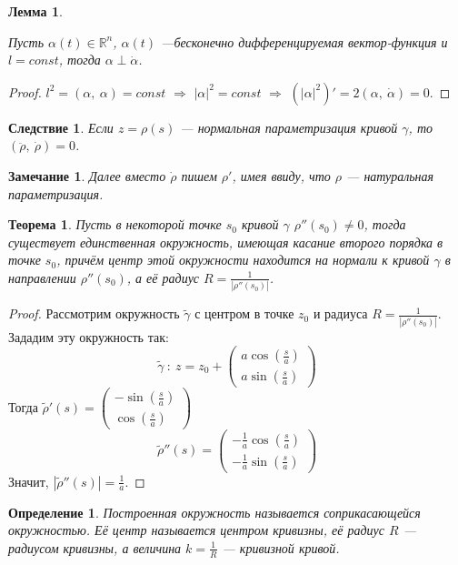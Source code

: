 \documentclass[12pt]{article}
\theoremstyle{plain}
\newtheorem{theorem}{Теорема}[section]
\newtheorem{consequence}{Следствие}[theorem]
\newtheorem{lemma}{Лемма}[section]
\newtheorem{definition}{Определение}[section]
\newtheorem{remark}{Замечание}
\newcommand{\R}{\mathbb R}
\begin{document}
    \begin{lemma}
        \hypertarget{d1}{}
        Пусть $\alpha(t)\in\R^n$, $\alpha(t)$ ---бесконечно дифференцируемая вектор-функция и $l=const$, тогда $\alpha\perp\dot{\alpha}$.
    \end{lemma}
    \begin{proof}
        $l^2=(\alpha, \ \alpha)=const$ $\Longrightarrow$ $|\alpha|^2=const$ $\Longrightarrow$ $(|\alpha|^2)'=2(\alpha, \ \dot{\alpha})=0$.
    \end{proof}
    \begin{consequence}
        Если $z=\rho(s)$ --- нормальная параметризация кривой $\gamma$, то $(\ddot{\rho}, \ \dot{\rho})=0$.
    \end{consequence}
    \begin{remark}
        Далее вместо $\dot{\rho}$ пишем $\rho'$, имея ввиду, что $\rho$ --- натуральная параметризация.
    \end{remark}
    \begin{theorem}
        Пусть в некоторой точке $s_0$ кривой $\gamma$ $\rho''(s_0)\neq0$, тогда существует единственная окружность, имеющая касание второго порядка в точке $s_0$, причём центр этой окружности находится на нормали к кривой $\gamma$ в направлении $\rho''(s_0)$, а её радиус $R=\frac{1}{|\rho''(s_0)|}$.
    \end{theorem}
    \begin{proof}
        Рассмотрим окружность $\tilde{\gamma}$ с центром в точке $z_0$ и радиуса $R=\frac{1}{|\rho''(s_0)|}$. Зададим эту окружность так:
        $$\tilde{\gamma} \ : \ z=z_0+\begin{pmatrix}
            a\cos(\frac{s}{a})\\
            a\sin(\frac{s}{a})
        \end{pmatrix}$$
        Тогда $\tilde{\rho}'(s)=\begin{pmatrix}
            -\sin(\frac{s}{a})\\
            \cos(\frac{s}{a})
        \end{pmatrix}$
        $$\tilde{\rho}''(s)=\begin{pmatrix}
            -\frac{1}{a}\cos(\frac{s}{a})\\
            -\frac{1}{a}\sin(\frac{s}{a})
        \end{pmatrix}$$
        Значит, $|\tilde{\rho}''(s)|=\frac{1}{a}$.
    \end{proof}
    \begin{definition}
        Построенная окружность называется соприкасающейся окружностью. Её центр называется центром кривизны, её радиус $R$ --- радиусом кривизны, а величина $k=\frac{1}{R}$ --- кривизной кривой.
    \end{definition}
\end{document}
